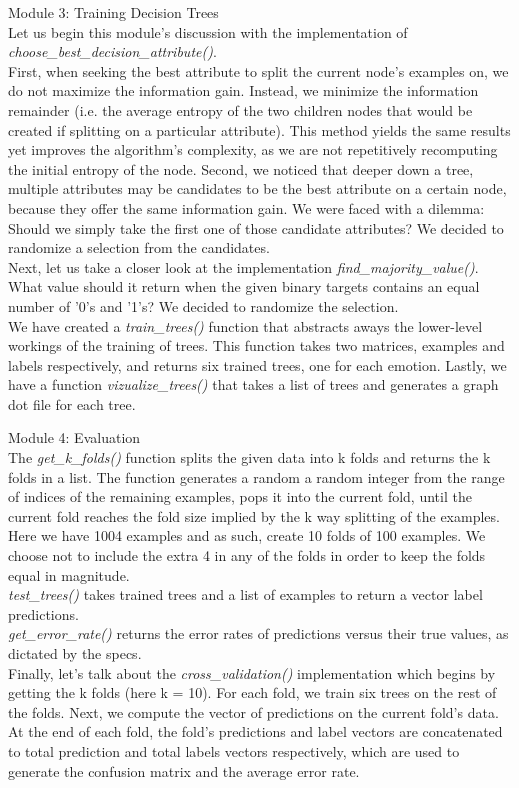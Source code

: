 Module 3: Training Decision Trees \\
Let us begin this module's discussion with the implementation of \emph{choose\_best\_decision\_attribute()}. \\
First, when seeking the best attribute to split the current node's examples on, we do not maximize the information gain.
Instead, we minimize the information remainder (i.e. the average entropy of the two children nodes
that would be created if splitting on a particular attribute).
This method yields the same results yet improves the algorithm's complexity,
as we are not repetitively recomputing the initial entropy of the node.
Second, we noticed that deeper down a tree, multiple attributes may be candidates to be the best attribute on a certain node,
because they offer the same information gain. We were faced with a dilemma: Should we simply
take the first one of those candidate attributes? We decided to randomize a selection from the candidates.\\
Next, let us take a closer look at the implementation \emph{find\_majority\_value()}.\\
What value should it return when the given binary targets contains an equal number of
'0's and '1's? We decided to randomize the selection.\\
We have created a \emph{train\_trees()} function that abstracts aways the lower-level workings of the training
of trees. This function takes two matrices, examples and labels respectively,
and returns six trained trees, one for each emotion.
Lastly, we have a function \emph{vizualize\_trees()} that takes a list of trees and generates a graph dot file
for each tree.

Module 4: Evaluation \\
The \emph{get\_k\_folds()} function splits the given data into k folds and returns the k folds in a list.
The function generates a random a random integer from the range of indices
of the remaining examples, pops it into the current fold, until the current fold reaches the fold size implied
by the k way splitting of the examples. Here we have 1004 examples and as such, create 10 folds of 100 examples.
We choose not to include the extra 4 in any of the folds in order to keep the folds equal in magnitude.\\
\emph{test\_trees()} takes trained trees and a list of examples to return a vector label predictions.\\
\emph{get\_error\_rate()} returns the error rates of predictions versus their true values, as dictated by the specs.\\
Finally, let's talk about the \emph{cross\_validation()} implementation which begins by getting the k folds (here k = 10).
For each fold, we train six trees on the rest of the folds. Next, we compute the vector of predictions on the current fold's data.
At the end of each fold, the fold's predictions and label vectors are concatenated to total prediction and
total labels vectors respectively, which are used to generate the confusion matrix and the average error rate.
